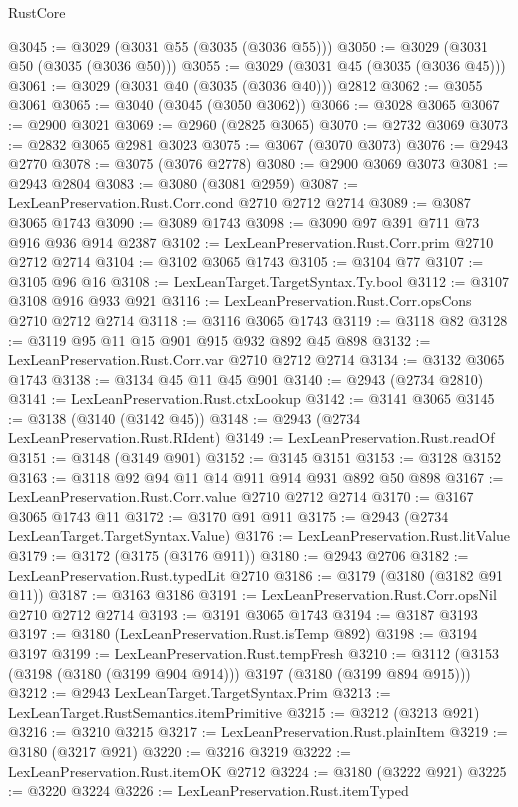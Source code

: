\begin{lexlean}{RustCore}
\begin{coremodule}
@3045 := @3029 (@3031 @55 (@3035 (@3036 @55)))
@3050 := @3029 (@3031 @50 (@3035 (@3036 @50)))
@3055 := @3029 (@3031 @45 (@3035 (@3036 @45)))
@3061 := @3029 (@3031 @40 (@3035 (@3036 @40))) @2812
@3062 := @3055 @3061
@3065 := @3040 (@3045 (@3050 @3062))
@3066 := @3028 @3065
@3067 := @2900 @3021
@3069 := @2960 (@2825 @3065)
@3070 := @2732 @3069
@3073 := @2832 @3065 @2981 @3023
@3075 := @3067 (@3070 @3073)
@3076 := @2943 @2770
@3078 := @3075 (@3076 @2778)
@3080 := @2900 @3069 @3073
@3081 := @2943 @2804
@3083 := @3080 (@3081 @2959)
@3087 := LexLeanPreservation.Rust.Corr.cond @2710 @2712 @2714
@3089 := @3087 @3065 @1743
@3090 := @3089 @1743
@3098 := @3090 @97 @391 @711 @73 @916 @936 @914 @2387
@3102 := LexLeanPreservation.Rust.Corr.prim @2710 @2712 @2714
@3104 := @3102 @3065 @1743
@3105 := @3104 @77
@3107 := @3105 @96 @16
@3108 := LexLeanTarget.TargetSyntax.Ty.bool
@3112 := @3107 @3108 @916 @933 @921
@3116 := LexLeanPreservation.Rust.Corr.opsCons @2710 @2712 @2714
@3118 := @3116 @3065 @1743
@3119 := @3118 @82
@3128 := @3119 @95 @11 @15 @901 @915 @932 @892 @45 @898
@3132 := LexLeanPreservation.Rust.Corr.var @2710 @2712 @2714
@3134 := @3132 @3065 @1743
@3138 := @3134 @45 @11 @45 @901
@3140 := @2943 (@2734 @2810)
@3141 := LexLeanPreservation.Rust.ctxLookup
@3142 := @3141 @3065
@3145 := @3138 (@3140 (@3142 @45))
@3148 := @2943 (@2734 LexLeanPreservation.Rust.RIdent)
@3149 := LexLeanPreservation.Rust.readOf
@3151 := @3148 (@3149 @901)
@3152 := @3145 @3151
@3153 := @3128 @3152
@3163 := @3118 @92 @94 @11 @14 @911 @914 @931 @892 @50 @898
@3167 := LexLeanPreservation.Rust.Corr.value @2710 @2712 @2714
@3170 := @3167 @3065 @1743 @11
@3172 := @3170 @91 @911
@3175 := @2943 (@2734 LexLeanTarget.TargetSyntax.Value)
@3176 := LexLeanPreservation.Rust.litValue
@3179 := @3172 (@3175 (@3176 @911))
@3180 := @2943 @2706
@3182 := LexLeanPreservation.Rust.typedLit @2710
@3186 := @3179 (@3180 (@3182 @91 @11))
@3187 := @3163 @3186
@3191 := LexLeanPreservation.Rust.Corr.opsNil @2710 @2712 @2714
@3193 := @3191 @3065 @1743
@3194 := @3187 @3193
@3197 := @3180 (LexLeanPreservation.Rust.isTemp @892)
@3198 := @3194 @3197
@3199 := LexLeanPreservation.Rust.tempFresh
@3210 := @3112 (@3153 (@3198 (@3180 (@3199 @904 @914))) @3197 (@3180 (@3199 @894 @915)))
@3212 := @2943 LexLeanTarget.TargetSyntax.Prim
@3213 := LexLeanTarget.RustSemantics.itemPrimitive
@3215 := @3212 (@3213 @921)
@3216 := @3210 @3215
@3217 := LexLeanPreservation.Rust.plainItem
@3219 := @3180 (@3217 @921)
@3220 := @3216 @3219
@3222 := LexLeanPreservation.Rust.itemOK @2712
@3224 := @3180 (@3222 @921)
@3225 := @3220 @3224
@3226 := LexLeanPreservation.Rust.itemTyped

\end{coremodule}
\end{lexlean}
